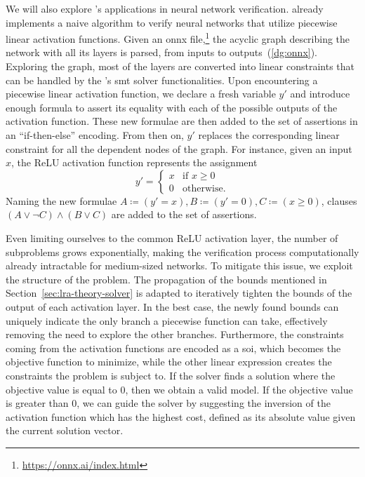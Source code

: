 \documentclass[runningheads]{llncs}
\begin{document}
We will also explore \dlinear's applications in neural network verification.
\dlinear already implements a naive algorithm to verify neural networks that utilize piecewise linear activation functions.
Given an \gls{onnx} file,\footnote{\url{https://onnx.ai/index.html}} the acyclic graph describing the network with all its layers is parsed, from inputs to outputs~(\autoref{dg:onnx}).
Exploring the graph, most of the layers are converted into linear constraints that can be handled by the \dlinear's \gls{smt} solver functionalities.
Upon encountering a piecewise linear activation function, we declare a fresh variable $y'$ and introduce enough formula to assert its equality with each of the possible outputs of the activation function.
These new formulae are then added to the set of assertions in an ``if-then-else'' encoding.
From then on, $y'$ replaces the corresponding linear constraint for all the dependent nodes of the graph.
For instance, given an input $x$, the ReLU activation function represents the assignment
\begin{equation*}
    y' = \begin{cases}
        x & \text{if } x \ge 0 \\
        0 & \text{otherwise} .
    \end{cases}
\end{equation*}
Naming the new formulae $A \coloneqq (y' = x), B \coloneqq (y' = 0), C \coloneqq (x \ge 0)$, clauses $(A \lor \neg C) \land (B \lor C)$ are added to the set of assertions.

Even limiting ourselves to the common ReLU activation layer, the number of subproblems grows exponentially, making the verification process computationally already intractable for medium-sized networks.
To mitigate this issue, we exploit the structure of the problem.
The propagation of the bounds mentioned in Section~\ref{sec:lra-theory-solver} is adapted to iteratively tighten the bounds of the output of each activation layer.
In the best case, the newly found bounds can uniquely indicate the only branch a piecewise function can take, effectively removing the need to explore the other branches.
Furthermore, the constraints coming from the activation functions are encoded as a \gls{soi}, which becomes the objective function to minimize, while the other linear expression creates the constraints the problem is subject to.
If the solver finds a solution where the objective value is equal to $0$, then we obtain a valid model.
If the objective value is greater than $0$, we can guide the solver by suggesting the inversion of the activation function which has the highest cost, defined as its absolute value given the current solution vector.
\end{document}
